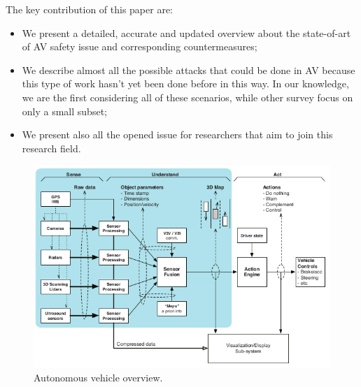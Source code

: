     \newline
    The key contribution of this paper are:
    \begin{itemize}
        \item We present a detailed, accurate and updated overview about the state-of-art of AV safety issue and corresponding countermeasures;
        \item We describe almost all the possible attacks that could be done in AV because this type of work hasn't yet been done before in this way. In our knowledge, we are the first considering all of these scenarios, while other survey focus on only a small subset;
        \item We present also all the opened issue for researchers that aim to join this research field.
    \end{itemize}
    
    
    
    \begin{figure}
        \centering
        \includegraphics[width=.7\linewidth]{./files/Schermata da 2020-02-13 12-41-35.png}
        \caption{Autonomous vehicle overview.}
        \label{fig:AVoverview}
    \end{figure}

